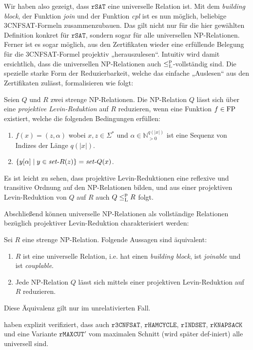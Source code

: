 Wir haben also gezeigt, dass $\mathtt{rSAT}$ eine universelle Relation ist.
Mit dem \emph{building block}, der Funktion \emph{join} und der Funktion \emph{cpl} ist es nun möglich, beliebige 3CNFSAT-Formeln zusammenzubauen.
Das gilt nicht nur für die hier gewählten Definition konkret für $\mathtt{rSAT}$, sondern sogar für alle universellen NP-Relationen.
Ferner ist es sogar möglich, aus den Zertifikaten wieder eine erfüllende Belegung für die 3CNFSAT-Formel projektiv „herauszulesen“.
Intuitiv wird damit ersichtlich, dass die universellen NP-Relationen auch $\leq_\mathrm{L}^\mathrm{p}$-vollständig sind.
Die spezielle starke Form der Reduzierbarkeit, welche das einfache „Auslesen“ aus den Zertifikaten zulässt, formalisieren \citeauthor{agrawal_universal_1992} wie folgt:
\begin{definition}\label{def:projective-reduction}
    Seien $Q$ und $R$ zwei strenge NP-Relationen.
    Die NP-Relation $Q$ lässt sich über eine \emph{projektive Levin-Reduktion} auf $R$ reduzieren, wenn eine Funktion $f\in\mathrm{FP}$ existiert, welche die folgenden Bedingungen erfüllen:
    \begin{enumerate}
        \item $f(x)=(z,\alpha)$ wobei $x,z\in\Sigma^*$ und $\alpha\in\mathbb N_{>0}^{q(|x|)}$ ist eine Sequenz von Indizes der Länge $q(|x|)$.
        \item $\{ y[\alpha] \mid y\in \mathit{set}\text{-}{}R(z) \} = \mathit{set}\text{-}{}Q(x)$. \qedhere
    \end{enumerate}
\end{definition}
Es ist leicht zu sehen, dass projektive Levin-Reduktionen eine reflexive und transitive Ordnung auf den NP-Relationen bilden, und aus einer projektiven Levin-Reduktion von $Q$ auf $R$ auch $Q\leq_\mathrm{L}^\mathrm{p} R$ folgt. 

Abschließend können universelle NP-Relationen als vollständige Relationen bezüglich projektiver Levin-Reduktion charakterisiert werden:
\begin{theorem}\label{thm:universal-relations}
    Sei $R$ eine strenge NP-Relation.
    Folgende Aussagen sind äquivalent:
    \begin{enumerate}
        \item $R$ ist eine universelle Relation, i.e.  hat einen \emph{building block}, ist \emph{joinable} und ist \emph{couplable}.
        \item Jede NP-Relation $Q$ lässt sich mittels einer projektiven Levin-Reduktion auf $R$ reduzieren.
    \end{enumerate}
    Diese Äquivalenz gilt nur im unrelativierten Fall.
\end{theorem}
\textcite{agrawal_universal_1992} haben explizit verifiziert, dass auch $\mathtt{r3CNFSAT}$, $\mathtt{rHAMCYCLE}$, $\mathtt{rINDSET}$, $\mathtt{rKNAPSACK}$ und eine Variante $\mathtt{rMAXCUT}'$ vom maximalen Schnitt (wird später def-\linebreak{}iniert) alle universell sind.

